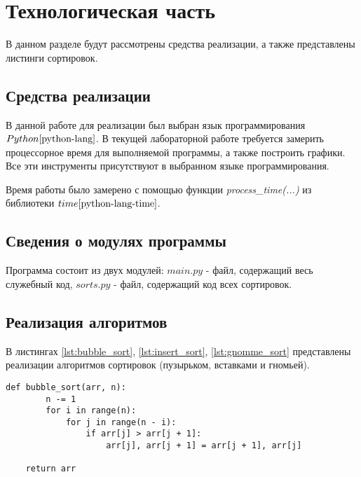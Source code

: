 \chapter{Технологическая часть}

В данном разделе будут рассмотрены средства реализации, а также представлены листинги сортировок.

\section{Средства реализации}
В данной работе для реализации был выбран язык программирования $Python \cite{python-lang}$. В текущей лабораторной работе требуется замерить процессорное время для выполняемой программы, а также построить графики. Все эти инструменты присутствуют в выбранном языке программирования.

Время работы было замерено с помощью функции \textit{process\_time(...)} из библиотеки $time \cite{python-lang-time}$.

\section{Сведения о модулях программы}
Программа состоит из двух модулей: $main.py$ - файл, содержащий весь служебный код, $sorts.py$ - файл, содержащий код всех сортировок. \newline


\section{Реализация алгоритмов}

В листингах \ref{lst:bubble_sort}, \ref{lst:insert_sort}, \ref{lst:gnomme_sort} представлены реализации алгоритмов сортировок (пузырьком, вставками и гномьей).

\begin{center}
    \captionsetup{justification=raggedright,singlelinecheck=off}
    \begin{lstlisting}[label=lst:bubble_sort,caption=Алгоритм сортировки пузырьком]
    def bubble_sort(arr, n):
        n -= 1
        for i in range(n):
            for j in range(n - i):
                if arr[j] > arr[j + 1]:
                    arr[j], arr[j + 1] = arr[j + 1], arr[j]

    return arr
\end{lstlisting}
\end{center}

\clearpage

